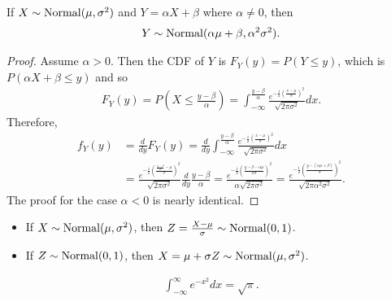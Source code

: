 \begin{thm}
    If $X \sim \mathrm{Normal}(\mu, \sigma^2)$ and $Y = \alpha X + \beta$ where $\alpha \neq 0$, then
    \begin{align*}
        Y \sim \mathrm{Normal}(\alpha\mu + \beta, \alpha^2\sigma^2).
    \end{align*}
\end{thm}

\begin{proof}
    Assume $\alpha > 0$. Then the CDF of $Y$ is $F_Y(y) = P(Y \leq y)$, which is $P(\alpha X + \beta \leq y)$ and so
    \begin{align*}
        F_Y(y) = P\left(X \leq \frac{y - \beta}{\alpha}\right) = \int_{-\infty}^{\frac{y-\beta}{\alpha}}\frac{e^{-\frac{1}{2}\left(\frac{x - \mu}{\sigma}\right)^2}}{\sqrt{2\pi\sigma^2}}dx.
    \end{align*}
    Therefore,
    \begin{align*}
        f_Y(y) &= \frac{d}{dy}F_Y(y) = \frac{d}{dy}\int_{-\infty}^{\frac{y-\beta}{\alpha}}\frac{e^{-\frac{1}{2}\left(\frac{x - \mu}{\sigma}\right)^2}}{\sqrt{2\pi\sigma^2}}dx \\
        &= \frac{e^{-\frac{1}{2}\left(\frac{\frac{y-\beta}{\alpha} - \mu}{\sigma}\right)^2}}{\sqrt{2\pi\sigma^2}}\frac{d}{dy}\frac{y - \beta}{\alpha} = \frac{e^{-\frac{1}{2}\left(\frac{y - \beta - \alpha\mu}{\alpha\sigma}\right)^2}}{\alpha\sqrt{2\pi\sigma^2}} = \frac{e^{-\frac{1}{2}\left(\frac{y - \left(\alpha\mu + \beta\right)}{\sigma}\right)^2}}{\sqrt{2\pi\alpha^2\sigma^2}}.
    \end{align*}
    The proof for the case $\alpha < 0$ is nearly identical.
\end{proof}

\begin{cor}\proofbreak
    \begin{itemize}
        \item If $X \sim \mathrm{Normal}(\mu, \sigma^2)$, then $Z = \frac{X - \mu}{\sigma} \sim \mathrm{Normal}(0, 1)$.
        \item If $Z \sim \mathrm{Normal}(0, 1)$, then $X = \mu + \sigma Z \sim \mathrm{Normal}(\mu, \sigma^2)$.
    \end{itemize}
\end{cor}

\begin{lemma}\label{gaussian-integral}
    \begin{align*}
        \int_{-\infty}^{\infty}e^{-x^2}dx = \sqrt{\pi}.
    \end{align*}
\end{lemma}

